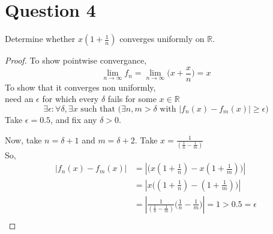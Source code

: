 \documentclass[20pt,a4paper]{extarticle} %
\theoremstyle{definition}
\theoremstyle{definition}
\begin{document}
\section*{Question 4}
Determine whether $x(1+ \frac{1}{n} )$ converges uniformly on $\mathbb{R}$.
\begin{proof}
	To show pointwise convergance,
	\[ \lim_{n \to \infty} f_n = \lim_{n \to \infty} \big( x + \frac{x}{n} \big) = x \]
	To show that it converges non uniformly,\\
	need an $\epsilon$ for which every $\delta$ fails for some $x \in \mathbb{R}$
	\[ \exists \epsilon : \forall \delta, \exists x \text{ such that }
	\Big( \exists n,m> \delta \text{ with } |f_n(x) - f_m(x)| \geq \epsilon \Big) \]
	Take $\epsilon = 0.5$, and fix any $\delta>0$.

	Now, take $n=\delta+1$ and $m=\delta+2$.
	Take $x= \frac{1}{(\frac{1}{n} - \frac{1}{m})}$\\
	So,
	\begin{align*}
		|f_n(x) - f_m(x)|&=|\Big(x(1+ \frac{1}{n} )-x(1+ \frac{1}{m}) \Big)|\\
				 &=|x\Big((1+ \frac{1}{n} )-(1+ \frac{1}{m} )\Big)|\\
				 &=|\frac{1}{(\frac{1}{n} - \frac{1}{m})}
				 \big(\frac{1}{n} -\frac{1}{m} \big)|=1>0.5=\epsilon\\
	\end{align*}
\end{proof}
\newpage
\end{document}
